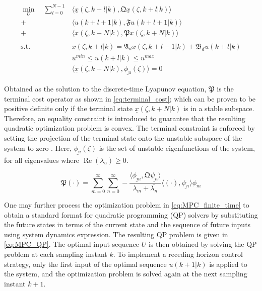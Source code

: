 \begin{equation} \label{eq:MPC_finite_time}
    \begin{aligned}
        \min_{U} \quad \sum_{l=0}^{N-1} &\langle \underline{x}(\zeta, k+l | k), \mathfrak{Q} \underline{x}(\zeta, k+l | k) \rangle \\
        + &\langle u(k+l+1 | k), \mathfrak{F} u(k+l+1|k) \rangle \\
        + &\langle \underline{x}(\zeta, k+N | k), \mathfrak{P} \underline{x}(\zeta, k+N | k) \rangle \\
        \, \\
        \text{s.t.} \quad &\underline{x}(\zeta, k+l | k) = \mathfrak{A}_d \underline{x}(\zeta, k+l-1 | k) + \mathfrak{B}_d u(k+l | k) \\
        &u^{min} \leq u(k+l | k) \leq u^{max} \\
        & \langle \underline{x}(\zeta, k+N | k), \underline{\phi_u}(\zeta) \rangle = 0
    \end{aligned}
\end{equation}

Obtained as the solution to the discrete-time Lyapunov equation, $\mathfrak{P}$ is the terminal cost operator as shown in \eqref{eq:terminal_cost}; which can be proven to be positive definite only if the terminal state $\underline{x}(\zeta, k+N | k)$ is in a stable subspace. Therefore, an equality constraint is introduced to guarantee that the resulting quadratic optimization problem is convex. The terminal constraint is enforced by setting the projection of the terminal state onto the unstable subspace of the system to zero \cite{curtainbook, xu2017linear, khatibi2021model}. Here, $\underline{\phi_u}(\zeta)$ is the set of unstable eigenfunctions of the system, for all eigenvalues where $\operatorname{Re}(\lambda_u) \geq 0$.

\begin{equation} \label{eq:terminal_cost}
    \mathfrak{P} (\cdot) = \sum_{m=0}^{\infty} \sum_{n=0}^{\infty} 
    -\frac{
        \langle \underline{\phi_m} , \mathfrak{Q} \underline{\psi_n} \rangle
    }{
        \lambda_m + \overline{\lambda_n}
    }
    \langle (\cdot) , \underline{\psi_n} \rangle \phi_m
\end{equation}

One may further process the optimization problem in \eqref{eq:MPC_finite_time} to obtain a standard format for quadratic programming (QP) solvers by substituting the future states in terms of the current state and the sequence of future inputs using system dynamics expression. The resulting QP problem is given in \eqref{eq:MPC_QP}. The optimal input sequence $U$ is then obtained by solving the QP problem at each sampling instant $k$. To implement a receding horizon control strategy, only the first input of the optimal sequence $u(k+1|k)$ is applied to the system, and the optimization problem is solved again at the next sampling instant $k+1$.

